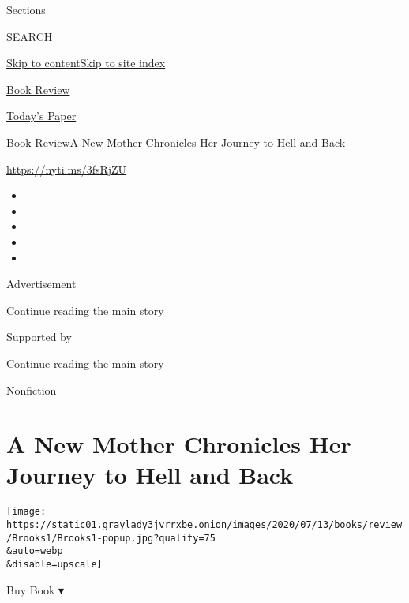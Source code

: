 Sections

SEARCH

\protect\hyperlink{site-content}{Skip to
content}\protect\hyperlink{site-index}{Skip to site index}

\href{https://www.nytimes3xbfgragh.onion/section/books/review}{Book
Review}

\href{https://myaccount.nytimes3xbfgragh.onion/auth/login?response_type=cookie\&client_id=vi}{}

\href{https://www.nytimes3xbfgragh.onion/section/todayspaper}{Today's
Paper}

\href{/section/books/review}{Book Review}\textbar{}A New Mother
Chronicles Her Journey to Hell and Back

\url{https://nyti.ms/3fsRjZU}

\begin{itemize}
\item
\item
\item
\item
\item
\end{itemize}

Advertisement

\protect\hyperlink{after-top}{Continue reading the main story}

Supported by

\protect\hyperlink{after-sponsor}{Continue reading the main story}

Nonfiction

\hypertarget{a-new-mother-chronicles-her-journey-to-hell-and-back}{%
\section{A New Mother Chronicles Her Journey to Hell and
Back}\label{a-new-mother-chronicles-her-journey-to-hell-and-back}}

\texttt{[image: https://static01.graylady3jvrrxbe.onion/images/2020/07/13/books/review/Brooks1/Brooks1-popup.jpg?quality=75\\\&auto=webp\\\&disable=upscale]}

Buy Book ▾

